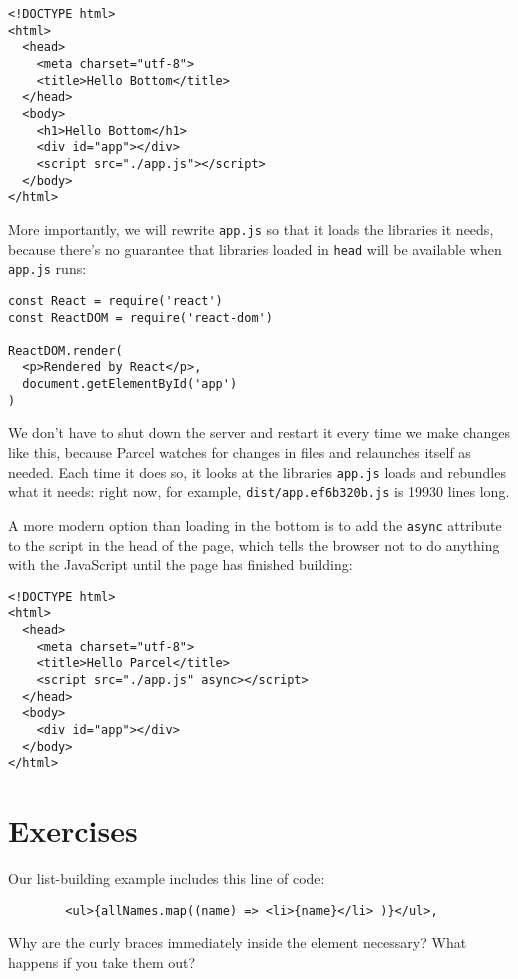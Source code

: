 \begin{verbatim}
<!DOCTYPE html>
<html>
  <head>
    <meta charset="utf-8">
    <title>Hello Bottom</title>
  </head>
  <body>
    <h1>Hello Bottom</h1>
    <div id="app"></div>
    <script src="./app.js"></script>
  </body>
</html>
\end{verbatim}

More importantly,
we will rewrite \texttt{app.js} so that it loads the libraries it needs,
because there's no guarantee that libraries loaded in \texttt{head} will be available when \texttt{app.js} runs:

\begin{verbatim}
const React = require('react')
const ReactDOM = require('react-dom')

ReactDOM.render(
  <p>Rendered by React</p>,
  document.getElementById('app')
)
\end{verbatim}

We don't have to shut down the server and restart it every time we make changes like this,
because Parcel watches for changes in files and relaunches itself as needed.
Each time it does so,
it looks at the libraries \texttt{app.js} loads and rebundles what it needs:
right now,
for example,
\texttt{dist/app.ef6b320b.js} is 19930 lines long.

A more modern option than loading in the bottom is to add the \texttt{async} attribute to the script in the head of the page,
which tells the browser not to do anything with the JavaScript until the page has finished building:

\begin{verbatim}
<!DOCTYPE html>
<html>
  <head>
    <meta charset="utf-8">
    <title>Hello Parcel</title>
    <script src="./app.js" async></script>
  </head>
  <body>
    <div id="app"></div>
  </body>
</html>
\end{verbatim}

\section{Exercises}\label{s:dynamic-exercises}


Our list-building example includes this line of code:

\begin{verbatim}
        <ul>{allNames.map((name) => <li>{name}</li> )}</ul>,
\end{verbatim}

Why are the curly braces immediately inside the \texttt{} element necessary?
What happens if you take them out?

